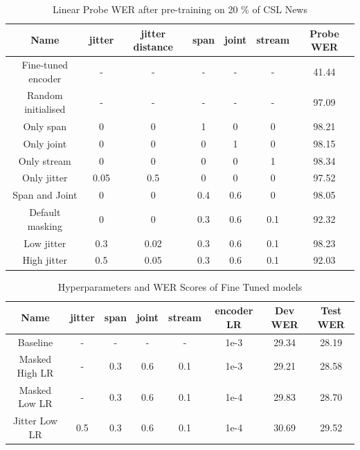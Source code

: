 \documentclass{article}
\begin{document}
\begin{table}[htbp]
  \centering
\begin{tabular}{|c||c|c||c|c|c||c|}
    \hline
      Name & jitter & jitter distance & span & joint & stream & Probe WER \\
    \hline 
    Fine-tuned encoder & - & - & - & - & - & 41.44 \\
    \hline    
    Random initialised & - & - & - & - & - & 97.09 \\
    \hline
    \hline
    Only span & 0 & 0 & 1 & 0 & 0 & 98.21 \\
    \hline
    Only joint & 0 & 0 & 0 & 1 & 0 & 98.15 \\
    \hline
    Only stream & 0 & 0 & 0 & 0 & 1 & 98.34 \\
    \hline
    Only jitter & 0.05 & 0.5 & 0 & 0 & 0 & 97.52 \\
    \hline
    Span and Joint & 0 & 0 & 0.4 & 0.6 & 0 & 98.05 \\
    \hline
    Default masking & 0 & 0 & 0.3 & 0.6 & 0.1 & 92.32 \\
    \hline
    Low jitter & 0.3 & 0.02 & 0.3 & 0.6 & 0.1 & 98.23 \\
    \hline
    High jitter & 0.5 & 0.05 & 0.3 & 0.6 & 0.1 & 92.03 \\
    \hline
  \end{tabular}
  \caption{Linear Probe WER after pre-training on 20 \% of CSL News}
  \label{tab:probe-masking}
\end{table}

\begin{table}[htbp]
  \centering
\begin{tabular}{|c||c|c|c|c|c||c|c|}
    \hline
      Name  & jitter & span & joint & stream & encoder LR & Dev WER & Test WER\\
    \hline
    Baseline & - & - & - & - &  1e-3  & 29.34 & 28.19 \\
    \hline
    Masked High LR  & - & 0.3 & 0.6 & 0.1 & 1e-3 & 29.21 & 28.58 \\
    \hline
    Masked Low LR & - & 0.3 & 0.6 & 0.1 & 1e-4 & 29.83 & 28.70 \\
    \hline
    Jitter Low LR & 0.5 & 0.3 & 0.6 & 0.1 & 1e-4 & 30.69 & 29.52 \\
    \hline
  \end{tabular}
  \caption{Hyperparameters and WER Scores of Fine Tuned models}
    \label{tab:fine-tune-models}
\end{table}
\end{document}
